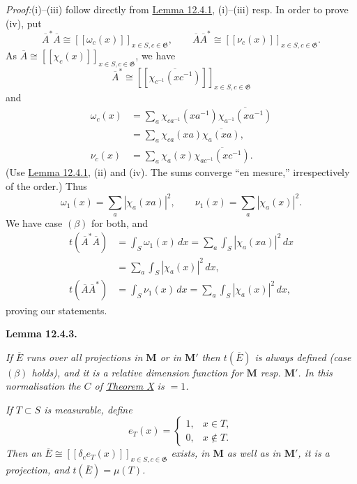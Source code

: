 \documentclass[12pt,b5paper,twoside]{article}
\newcommand{\M}{\mathbf M}
\newcommand{\Lemma}[1]{%
  \par\smallskip\noindent\phantomsection\label{lem:#1}\textbf{Lemma #1.}\enspace
}
\newcommand{\Proof}{\par\noindent\textit{Proof:}\enspace}
\newcommand{\lemref}[1]{\hyperref[lem:#1]{Lemma #1}}
\newcommand{\thmref}[1]{\hyperref[thm:#1]{Theorem #1}}
\begin{document}
\Proof (i)--(iii) follow directly from \lemref{12.4.1}, (i)--(iii) resp. In
order to prove (iv), put
\[
 \overline A^*\overline A
 \cong[[\omega_c(x)]]_{x\in S,c\in\mathfrak G},
 \qquad
 \overline A\overline A^*
 \cong[[\nu_c(x)]]_{x\in S,c\in\mathfrak G}.
\]
As $\overline A\cong[[\chi_c(x)]]_{x\in S,c\in\mathfrak G}$, we have
\[
 \overline A^*\cong
 [[\overline{\chi_{c^{-1}}(xc^{-1})}]]_{x\in S,c\in\mathfrak G}
\]
and
\begin{align*}
 \omega_c(x)
 &=\sum_a\chi_{ca^{-1}}(xa^{-1})
       \overline{\chi_{a^{-1}}(xa^{-1})}\\
 &=\sum_a\chi_{ca}(xa)\overline{\chi_a(xa)},\\
 \nu_c(x)
 &=\sum_a\chi_a(x)\overline{\chi_{ac^{-1}}(xc^{-1})}.
\end{align*}
(Use \lemref{12.4.1}, (ii) and (iv). The sums converge ``en mesure,''
irrespectively of the order.) Thus
\[
 \omega_1(x)=\sum_a|\chi_a(xa)|^2,
 \qquad
 \nu_1(x)=\sum_a|\chi_a(x)|^2.
\]
We have case $(\beta)$ for both, and
\begin{align*}
 t(\overline A^*\overline A)
 &=\int_S\omega_1(x)\,dx
 =\sum_a\int_S|\chi_a(xa)|^2\,dx\\
 &=\sum_a\int_S|\chi_a(x)|^2\,dx,\\
 t(\overline A\overline A^*)
 &=\int_S\nu_1(x)\,dx
 =\sum_a\int_S|\chi_a(x)|^2\,dx,
\end{align*}
proving our statements.

\Lemma{12.4.3}
\emph{If $\overline E$ runs over all projections in $\M$ or in $\M'$ then
$t(\overline E)$ is always defined (case $(\beta)$ holds), and it is a relative
dimension function for $\M$ resp. $\M'$. In this normalisation the $C$ of
\thmref{X} is $=1$.}

\emph{If $T\subset S$ is measurable, define}
\[
 e_T(x)=\begin{cases}
  1,&x\in T,\\
  0,&x\notin T.
 \end{cases}
\]
\emph{Then an $\overline E\cong
[[\delta_ce_T(x)]]_{x\in S,c\in\mathfrak G}$ exists, in $\M$ as well as in
$\M'$, it is a projection, and $t(\overline E)=\mu(T)$.}
\end{document}
